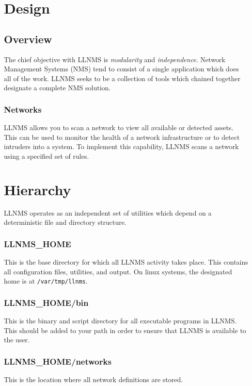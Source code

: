 \documentclass[12pt]{report}
\begin{document}
\section*{Design}

\subsection*{Overview}
The chief objective with LLNMS is \emph{modularity} and
\emph{independence}.  Network Management Systems (NMS) tend
to consist of a single application which does all of the work.  
LLNMS seeks to be a collection of tools which chained together 
designate a complete NMS solution. 


\subsubsection*{Networks}

LLNMS allows you to scan a network to view all available or detected assets.  This 
can be used to monitor the health of a network infrastructure or to detect intruders into
a system.  To implement this capability, LLNMS scans a network using a specified set of 
rules.  

\section*{Hierarchy}

LLNMS operates as an independent set of utilities which depend on 
a deterministic file and directory structure. 

\subsubsection*{LLNMS\_HOME}
This is the base directory for which all LLNMS activity takes place.  This
contains all configuration files, utilities, and output.  On linux systems, 
the designated home is at \texttt{/var/tmp/llnms}. 

\subsubsection*{LLNMS\_HOME/bin}
This is the binary and script directory for all executable programs in LLNMS.  This
should be added to your path in order to ensure that LLNMS is available to the user.

\subsubsection*{LLNMS\_HOME/networks}
This is the location where all network definitions are stored.
\end{document}
